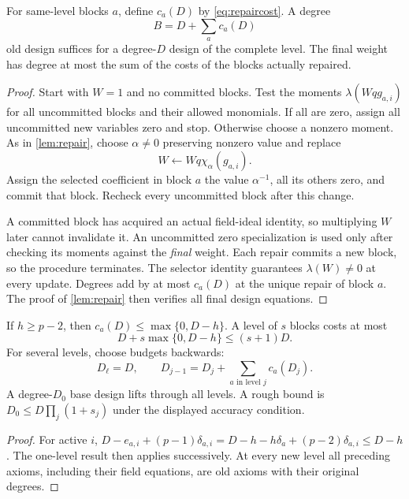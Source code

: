 \begin{lemma}\label{lem:levelrepair}
For same-level blocks $a$, define $c_a(D)$ by \eqref{eq:repaircost}. A degree
\[
 \boxed{B=D+\sum_a c_a(D)}
\]
old design suffices for a degree-$D$ design of the complete level. The final weight has degree at most the sum of the costs of the blocks actually repaired.
\end{lemma}
\begin{proof}
Start with $W=1$ and no committed blocks. Test the moments $\lambda(Wqg_{a,i})$ for all uncommitted blocks and their allowed monomials. If all are zero, assign all uncommitted new variables zero and stop. Otherwise choose a nonzero moment. As in \cref{lem:repair}, choose $\alpha\ne0$ preserving nonzero value and replace
\[
 W\leftarrow Wq\chi_\alpha(g_{a,i}).
\]
Assign the selected coefficient in block $a$ the value $\alpha^{-1}$, all its others zero, and commit that block. Recheck every uncommitted block after this change.

A committed block has acquired an actual field-ideal identity, so multiplying $W$ later cannot invalidate it. An uncommitted zero specialization is used only after checking its moments against the \emph{final} weight. Each repair commits a new block, so the procedure terminates. The selector identity guarantees $\lambda(W)\ne0$ at every update. Degrees add by at most $c_a(D)$ at the unique repair of block $a$. The proof of \cref{lem:repair} then verifies all final design equations.
\end{proof}

\begin{corollary}\label{cor:repairbudget}
If $h\ge p-2$, then $c_a(D)\le\max\{0,D-h\}$. A level of $s$ blocks costs at most
\[
 D+s\max\{0,D-h\}\le (s+1)D.
\]
For several levels, choose budgets backwards:
\[
 D_\ell=D,\qquad D_{j-1}=D_j+\sum_{a\text{ in level }j}c_a(D_j).
\]
A degree-$D_0$ base design lifts through all levels. A rough bound is $D_0\le D\prod_j(1+s_j)$ under the displayed accuracy condition.
\end{corollary}
\begin{proof}
For active $i$,
$D-e_{a,i}+(p-1)\delta_{a,i}
=D-h-h\delta_a+(p-2)\delta_{a,i}\le D-h$.
The one-level result then applies successively. At every new level all preceding axioms, including their field equations, are old axioms with their original degrees.
\end{proof}

